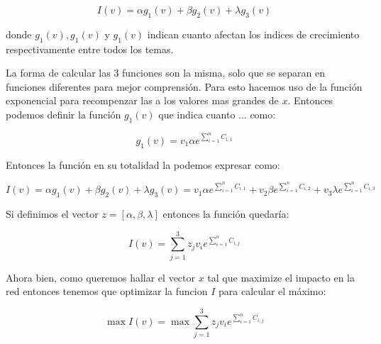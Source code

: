 \documentclass[12pt]{article}
\begin{document}
$$
I(v) = \alpha g_1(v) + \beta g_2(v) + \lambda g_3(v)
$$

donde $g_1(v), g_1(v)$ y $g_1(v)$ indican cuanto afectan los indices de crecimiento respectivamente entre todos los temas.

La forma de calcular las 3 funciones son la misma, solo que se separan en funciones diferentes para mejor comprensión. Para esto hacemos uso de la función exponencial para recompenzar las a los valores mas grandes de $x$. Entonces podemos definir la función $g_1(v)$ que indica cuanto ... como:

$$
g_1(v) = v_1 \alpha e ^ {\sum_{i=1}^{n} C_{i,1}} 
$$

Entonces la función en su totalidad la podemos expresar como:

$$
I(v) = \alpha g_1(v) + \beta g_2(v) + \lambda g_3(v) = v_1 \alpha e ^ {\sum_{i=1}^{n} C_{i,1}} + v_2 \beta e ^ {\sum_{i=1}^{n} C_{i,2}} + v_3 \lambda e ^ {\sum_{i=1}^{n} C_{i,3}}
$$

Si definimos el vector $z = [\alpha, \beta, \lambda]$ entonces la función quedaría:

$$
I(v) = \sum_{j=1}^{3} z_j v_i  e ^ {\sum_{i=1}^{n} C_{i,j}}
$$

Ahora bien, como queremos hallar el vector $x$ tal que maximize el impacto en la red entonces tenemos que optimizar la funcion $I$ para calcular el máximo:

$$
\max I(v) = \max \sum_{j=1}^{3} z_j v_i e ^ {\sum_{i=1}^{n} C_{i,j}}
$$






\vspace{10cm}
\end{document}
